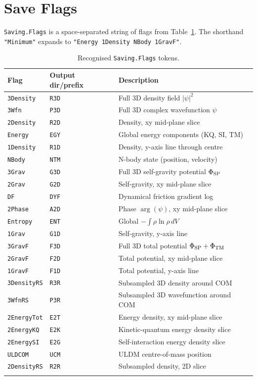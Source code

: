 \documentclass[11pt]{article}
\newcommand{\code}[1]{\texttt{#1}}
\newcommand{\field}[1]{\texttt{#1}}
\begin{document}
\section{Save Flags}
\label{sec:saveflags}

\field{Saving.Flags} is a space-separated string of flags from
Table~\ref{tab:saveflags}. The shorthand \code{"Minimum"} expands to
\code{"Energy 1Density NBody 1GravF"}.

\begin{longtable}{@{}lll@{}}
\toprule
Flag & Output dir/prefix & Description \\
\midrule
\endhead
\field{3Density} & \code{R3D} & Full 3D density field $|\psi|^2$ \\
\field{3Wfn} & \code{P3D} & Full 3D complex wavefunction $\psi$ \\
\field{2Density} & \code{R2D} & Density, xy mid-plane slice \\
\field{Energy} & \code{EGY} & Global energy components (KQ, SI, TM) \\
\field{1Density} & \code{R1D} & Density, y-axis line through centre \\
\field{NBody} & \code{NTM} & N-body state (position, velocity) \\
\field{3Grav} & \code{G3D} & Full 3D self-gravity potential $\Phi_{\rm SP}$ \\
\field{2Grav} & \code{G2D} & Self-gravity, xy mid-plane slice \\
\field{DF} & \code{DYF} & Dynamical friction gradient log \\
\field{2Phase} & \code{A2D} & Phase $\arg(\psi)$, xy mid-plane slice \\
\field{Entropy} & \code{ENT} & Global $-\int \rho \ln \rho\,dV$ \\
\field{1Grav} & \code{G1D} & Self-gravity, y-axis line \\
\field{3GravF} & \code{F3D} & Full 3D total potential $\Phi_{\rm SP}+\Phi_{\rm TM}$ \\
\field{2GravF} & \code{F2D} & Total potential, xy mid-plane slice \\
\field{1GravF} & \code{F1D} & Total potential, y-axis line \\
\field{3DensityRS} & \code{R3R} & Subsampled 3D density around COM \\
\field{3WfnRS} & \code{P3R} & Subsampled 3D wavefunction around COM \\
\field{2EnergyTot} & \code{E2T} & Energy density, xy mid-plane slice \\
\field{2EnergyKQ} & \code{E2K} & Kinetic-quantum energy density slice \\
\field{2EnergySI} & \code{E2G} & Self-interaction energy density slice \\
\field{ULDCOM} & \code{UCM} & ULDM centre-of-mass position \\
\field{2DensityRS} & \code{R2R} & Subsampled density, 2D slice \\
\bottomrule
\caption{Recognised \field{Saving.Flags} tokens.}
\label{tab:saveflags}
\end{longtable}
\end{document}
